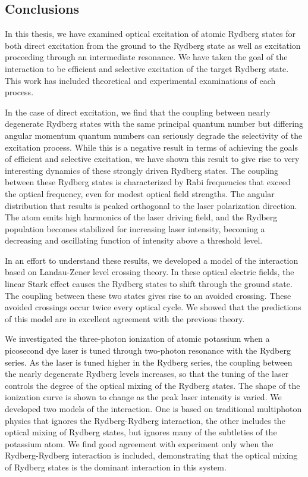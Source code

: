 \begin{singlespace}

\chapter{Conclusions}
\label{concl}
\begpagestyle

\end{singlespace}

In this thesis, we have examined optical excitation of atomic Rydberg
states for both direct excitation from the ground to the Rydberg state as
well as excitation proceeding through an intermediate resonance.  We have
taken the goal of the interaction to be efficient and selective excitation
of the target Rydberg state.  This work has included theoretical and
experimental examinations of each process.

In the case of direct excitation, we find that the coupling between nearly
degenerate Rydberg states with the same principal quantum number but differing
angular momentum quantum numbers can seriously degrade the selectivity of the
excitation process.  While this is a negative result in terms of achieving the
goals of efficient and selective excitation, we have shown this result to give
rise to very interesting dynamics of these strongly driven Rydberg states.  The
coupling between these Rydberg states is characterized by Rabi frequencies that
exceed the optical frequency, even for modest optical field strengths.  The
angular distribution that results is peaked orthogonal to the laser
polarization direction.  The atom emits high harmonics of the laser driving
field, and the Rydberg population becomes stabilized for increasing laser
intensity, becoming a decreasing and oscillating function of intensity above a
threshold level.

In an effort to understand these results, we developed a model of the
interaction based on Landau-Zener level crossing theory.  In these optical
electric fields, the linear Stark effect causes the Rydberg states to shift
through the ground state.  The coupling between these two states gives rise to
an avoided crossing.  These avoided crossings occur twice every optical cycle. 
We showed that the predictions of this model are in excellent agreement with the
previous theory.

We investigated the three-photon ionization of atomic potassium when a
picosecond dye laser is tuned through two-photon resonance with the Rydberg
series.  As the laser is tuned higher in the Rydberg series, the coupling
between the nearly degenerate Rydberg levels increases, so that the tuning of
the laser controls the degree of the optical mixing of the Rydberg states. 
The shape of the ionization curve is shown to change as the peak laser
intensity is varied.  We developed two models of the interaction.  One is based
on traditional multiphoton physics that ignores the Rydberg-Rydberg
interaction, the other includes the optical mixing of Rydberg states, but
ignores many of the subtleties of the potassium atom.  We find good agreement
with experiment only when the Rydberg-Rydberg interaction is included,
demonstrating that the optical mixing of Rydberg states is the dominant
interaction in this system.

